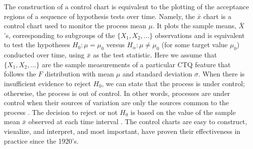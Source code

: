 
The construction of a control chart is equivalent to the plotting of the acceptance regions of a sequence of hypothesis tests over time. Namely, the $\bar{x}$ chart is a control chart used to monitor the process mean $\mu$. It plots the sample means, $\bar{X}$'s, corresponding to subgroups of the  $\{X_1,X_2,...\}$ observations and is equivalent to test the hypotheses $H_0:\mu=\mu_0$ versus $H_{\alpha}:\mu \neq \mu_0$ (for some target value $\mu_0$) conducted over time, using $\bar{x}$ as the test statistic. Here we assume that $\{X_1,X_2,...\}$ are the sample measurements of a particular CTQ feature that follows the $F$ distribution with mean $\mu$ and standard deviation $\sigma$. When there is insufficient evidence to reject $H_0$, we can state that the process is under control; otherwise, the process is out of control. In other words, processes are under control when their sources of variation are only the sources common to the process \citep{brown1990statistical}. The decision to reject or not $H_0$ is based on the value of the sample mean $\bar{x}$ observed at each time interval \citep{liu1996control}.
The control charts are easy to construct, visualize, and interpret, and most important, have proven their effectiveness in practice since the 1920's.

